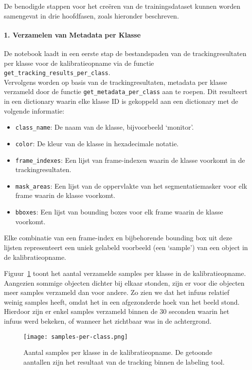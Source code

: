 De benodigde stappen voor het creëren van de trainingsdataset kunnen worden samengevat in drie hoofdfasen, zoals hieronder beschreven.

\paragraph{1. Verzamelen van Metadata per Klasse}

De notebook laadt in een eerste stap de bestandspaden van de trackingresultaten per klasse 
voor de kalibratieopname via de functie\\ \texttt{get\_tracking\_results\_per\_class}.\\
Vervolgens worden op basis van de trackingresultaten, metadata per klasse verzameld door de functie \texttt{get\_metadata\_per\_class} aan te roepen.
Dit resulteert in een dictionary waarin elke klasse ID is gekoppeld aan een dictionary met de volgende informatie:
\begin{itemize}
    \item \texttt{class\_name}: De naam van de klasse, bijvoorbeeld `monitor'.
    \item \texttt{color}: De kleur van de klasse in hexadecimale notatie.
    \item \texttt{frame\_indexes}: Een lijst van frame-indexen waarin de klasse voorkomt in de trackingresultaten.
    \item \texttt{mask\_areas}: Een lijst van de oppervlakte van het segmentatiemasker voor elk frame waarin de klasse voorkomt.
    \item \texttt{bboxes}: Een lijst van bounding boxes voor elk frame waarin de klasse voorkomt.
\end{itemize}
Elke combinatie van een frame-index en bijbehorende bounding box uit deze lijsten representeert 
een uniek gelabeld voorbeeld (een `sample') van een object in de kalibratieopname.

Figuur~\ref{fig:samples-per-class} toont het aantal verzamelde samples per klasse in de kalibratieopname. 
Aangezien sommige objecten dichter bij elkaar stonden, 
zijn er voor die objecten meer samples verzameld dan voor andere.
Zo zien we dat het infuus relatief weinig samples heeft, omdat het in een afgezonderde hoek van het beeld stond.
Hierdoor zijn er enkel samples verzameld binnen de 30 seconden waarin het infuus werd bekeken, 
of wanneer het zichtbaar was in de achtergrond.

\begin{figure}[H]
    \centering
    \texttt{[image: samples-per-class.png]}
    \caption[Aantal samples per klasse in de kalibratieopname]{
        \label{fig:samples-per-class}
        Aantal samples per klasse in de kalibratieopname.
        De getoonde aantallen zijn het resultaat van de tracking binnen de labeling tool.
      }
\end{figure}


